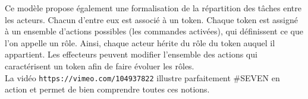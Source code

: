 \documentclass[11pt]{article}
\begin{document}
Ce modèle propose également une formalisation de la répartition des tâches entre les acteurs. Chacun d'entre eux est associé à un token. Chaque token est assigné à un ensemble d'actions possibles (les commandes activées), qui définissent ce que l'on appelle un rôle. Ainsi, chaque acteur hérite du rôle du token auquel il appartient. Les effecteurs peuvent modifier l'ensemble des actions qui caractérisent un token afin de faire évoluer les rôles.
\\

La vidéo \texttt{https://vimeo.com/104937822} illustre parfaitement \#SEVEN en action et permet de bien comprendre toutes ces notions. 

\begin{comment}
\section{Goals}

The user will have to achieve a set of tasks. They will be the pretext for testing different aspects of the coach presence and actions. What we want to evaluate through the tests are in general the global execution performance of the trainee and to what degree the ways the coach presence is represented are pleasant or at the contrary disturbing.

\paragraph{Directives} In order to tell to the user what is his next task, the coach will have to communicate with him. Three communication modes will be evaluated:
\begin{enumerate}
	\item oral communication;
	\item instructions written or drawn on a virtual support object (e.g, a board or a tablet);
	\item instructions written or drawn in a virtual menu that the user can open as a popup.
\end{enumerate}
The goal here is to evaluate the correlation between the execution time and performance and the communication way used.


\end{comment}
\end{document}
